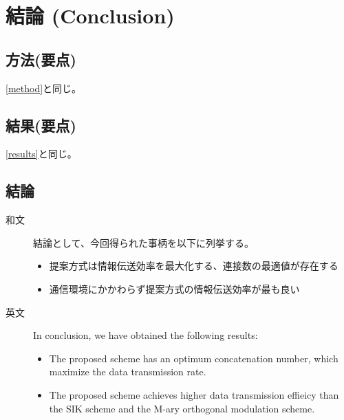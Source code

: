 ﻿\documentclass[a4j,10pt]{jarticle}
\begin{document}
\section{結論 (Conclusion)}
\subsection{方法(要点)}
\ref{method}と同じ。
\subsection{結果(要点)}
\ref{results}と同じ。
%
\subsection{結論}
\begin{description}
 \item[和文] 結論として、今回得られた事柄を以下に列挙する。
\begin{itemize}
 \item 提案方式は情報伝送効率を最大化する、連接数の最適値が存在する
 \item 通信環境にかかわらず提案方式の情報伝送効率が最も良い
\end{itemize}
%
 \item[英文] In conclusion, we have obtained the following results:
 \begin{itemize}
 \item The proposed scheme has an optimum concatenation number, which maximize the data transmission rate. 
 \item The proposed scheme achieves higher data transmission effieicy than the SIK scheme and the M-ary orthogonal modulation scheme. 
 \end{itemize}
\end{description}
%
\end{document}
